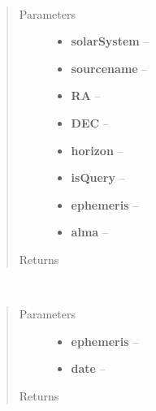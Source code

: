 \documentclass[a4paper,10pt,english]{sphinxmanual}
\begin{document}
\begin{fulllineitems}
\label{wtoapi:wtoAlgorithm.observable}~\begin{quote}\begin{description}
\item[{Parameters}] \leavevmode\begin{itemize}
\item {} 
\textbf{solarSystem} -- 

\item {} 
\textbf{sourcename} -- 

\item {} 
\textbf{RA} -- 

\item {} 
\textbf{DEC} -- 

\item {} 
\textbf{horizon} -- 

\item {} 
\textbf{isQuery} -- 

\item {} 
\textbf{ephemeris} -- 

\item {} 
\textbf{alma} -- 

\end{itemize}

\item[{Returns}] \leavevmode


\end{description}\end{quote}

\end{fulllineitems}


\begin{fulllineitems}
\label{wtoapi:wtoAlgorithm.read_ephemeris}~\begin{quote}\begin{description}
\item[{Parameters}] \leavevmode\begin{itemize}
\item {} 
\textbf{ephemeris} -- 

\item {} 
\textbf{date} -- 

\end{itemize}

\item[{Returns}] \leavevmode


\end{description}\end{quote}

\end{fulllineitems}
\end{document}
